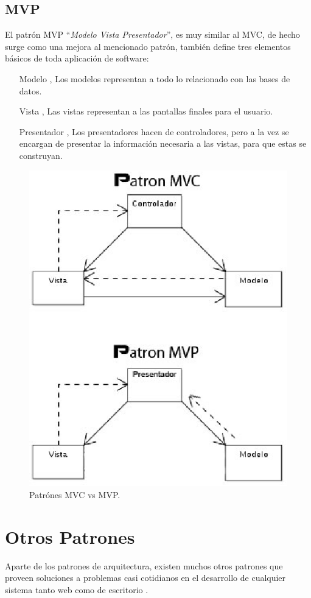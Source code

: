 \subsection{MVP}
El patr\'on MVP ``\emph{Modelo Vista Presentador}'', es muy similar al MVC, de hecho surge como una mejora al mencionado patr\'on, tambi\'en define tres elementos b\'asicos de toda aplicaci\'on de software:
\begin{itemize}
\item[Modelo], Los modelos representan a todo lo relacionado con las bases de datos.
\item[Vista], Las vistas representan a las pantallas finales para el usuario.
\item[Presentador], Los presentadores hacen de controladores, pero a la vez se encargan de presentar la informaci\'on necesaria a las vistas, para que estas se construyan.
\end{itemize}

\begin{figure}[h]
\centering
\includegraphics[scale=.7, keepaspectratio=true]{imagenes/11_imagen.png}
\caption{Patr\'ones MVC vs MVP.}
\end{figure}

\section{Otros Patrones}
Aparte de los patrones de arquitectura, existen muchos otros patrones que proveen soluciones a problemas casi cotidianos en el desarrollo de cualquier sistema tanto web como de escritorio \cite{design_patterns}.

